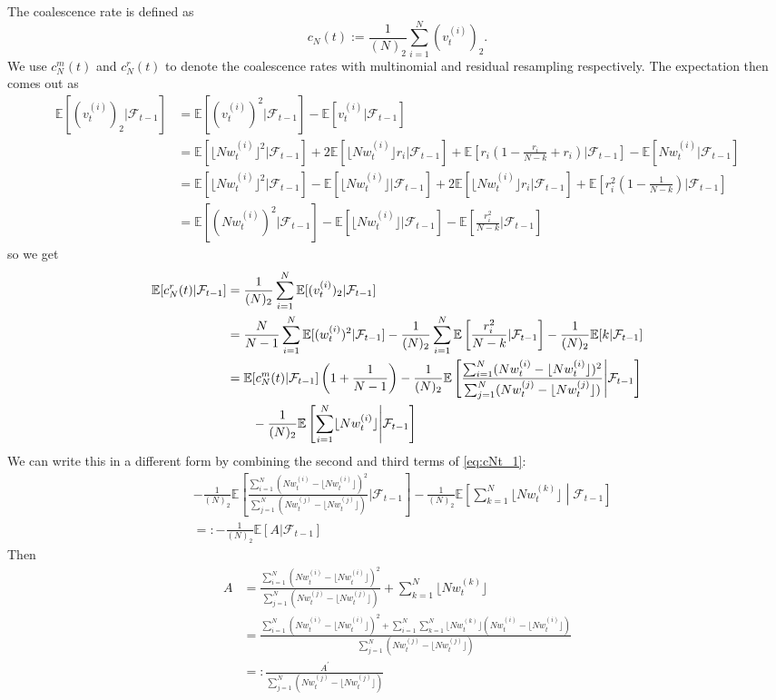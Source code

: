 \documentclass[fleqn]{article}
\theoremstyle{definition}
\newcommand{\E}{\mathbb{E}}
\newcommand{\F}{\mathcal{F}_{t-1}}
\newcommand{\vt}[2][t]{v_{#1}^{(#2)}}
\newcommand{\wt}[2][t]{w_{#1}^{(#2)}}
\begin{document}
The coalescence rate is defined as
\begin{equation*}
c_N(t) := \frac{1}{(N)_2} \sum_{i=1}^{N} (\vt{i})_2.
\end{equation*}
We use $c_N^m(t)$ and $c_N^r(t)$ to denote the coalescence rates with multinomial and residual resampling respectively.
The expectation then comes out as
\begin{align*}
\E[(\vt{i})_2 |\F] &= \E[(\vt{i})^2 |\F] - \E[\vt{i} |\F] \\
&= \E[\lfloor N\wt{i} \rfloor^2 |\F] + 2 \E[\lfloor N\wt{i} \rfloor r_i |\F] + \E\left[ r_i \left(1 - \frac{r_i}{N-k} + r_i \right) |\F \right] - \E[N\wt{i} |\F] \\
&=\E[ \lfloor N\wt{i} \rfloor^2 |\F] - \E[ \lfloor N\wt{i} \rfloor |\F] + 2 \E[ \lfloor N\wt{i} \rfloor r_i |\F] + \E\left[ r_i^2 \left(1- \frac{1}{N-k} \right) |\F\right] \\
&= \E[ (N\wt{i})^2 |\F] - \E[ \lfloor N\wt{i} \rfloor |\F] - \E\left[ \frac{r_i^2}{N-k} |\F \right]
\end{align*}
so we get
\begin{align}
\E[c^r_N(t) |\F] &=  \frac{1}{(N)_2}  \sum_{i=1}^{N} \E[(\vt{i})_2 |\F ]\notag\\
&= \frac{N}{N-1} \sum_{i=1}^{N} \E[(\wt{i})^2 |\F] - \frac{1}{(N)_2} \sum_{i=1}^{N} \E\left[ \frac{r_i^2}{N-k} |\F \right] - \frac{1}{(N)_2} \E[k |\F] \notag\\
&= \E[c^{m}_N(t) |\F] \left( 1 + \frac{1}{N-1} \right) - \frac{1}{(N)_2}  \E\left[ \frac{\sum_{i=1}^{N} (N\wt{i} - \lfloor N\wt{i}\rfloor)^2}{\sum_{j=1}^{N} (N\wt{j} - \lfloor N\wt{j}\rfloor)} \middle|\F \right] \notag\\
&\qquad -\frac{1}{(N)_2} \E \left[ \sum_{i=1}^{N} \lfloor N\wt{i}\rfloor \middle|\F \right]
\label{eq:cNt_1}
\end{align}
We can write this in a different form by combining the second and third terms of \eqref{eq:cNt_1}:
\begin{align*}
&- \frac{1}{(N)_2}  \E\left[ \frac{\sum_{i=1}^{N} (N\wt{i} - \lfloor N\wt{i}\rfloor)^2}{\sum_{j=1}^{N} (N\wt{j} - \lfloor N\wt{j}\rfloor)} |\F \right] 
-\frac{1}{(N)_2} \E \left[ \sum_{k=1}^{N} \lfloor N\wt{k}\rfloor \middle|\F \right] \\
&=: - \frac{1}{(N)_2} \E[A |\F]
\end{align*}
Then
\begin{align*}
A &=
 \frac{\sum_{i=1}^{N} (N\wt{i} - \lfloor N\wt{i}\rfloor)^2}{\sum_{j=1}^{N} (N\wt{j} - \lfloor N\wt{j}\rfloor)} 
+ \sum_{k=1}^{N} \lfloor N\wt{k}\rfloor \\
&= \frac{\sum_{i=1}^{N} (N\wt{i} - \lfloor N\wt{i}\rfloor)^2 + \sum_{i=1}^N\sum_{k=1}^N \lfloor N\wt{k} \rfloor (N\wt{i}- \lfloor N\wt{i} \rfloor)}{\sum_{j=1}^{N} (N\wt{j} - \lfloor N\wt{j}\rfloor)} \\
&=: \frac{A^\prime}{\sum_{j=1}^{N} (N\wt{j} - \lfloor N\wt{j}\rfloor)} 
\end{align*}
\end{document}
